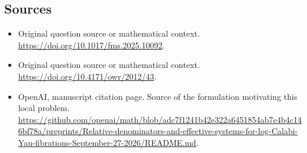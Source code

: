 \documentclass[11pt]{article}
\begin{document}
\subsection{Sources}
\begin{itemize}
\item[S1] Original question source or mathematical context.
\url{https://doi.org/10.1017/fms.2025.10092}.
\item[S2] Original question source or mathematical context.
\url{https://doi.org/10.4171/owr/2012/43}.
\item[S3] OpenAI, manuscript citation page. Source of the formulation motivating this local problem.
\url{https://github.com/openai/math/blob/adc7f1241b42e322a6451854ab7e4b4c146bf78a/preprints/Relative-denominators-and-effective-systems-for-log-Calabi-Yau-fibrations-September-27-2026/README.md}.
\end{itemize}
\end{document}
